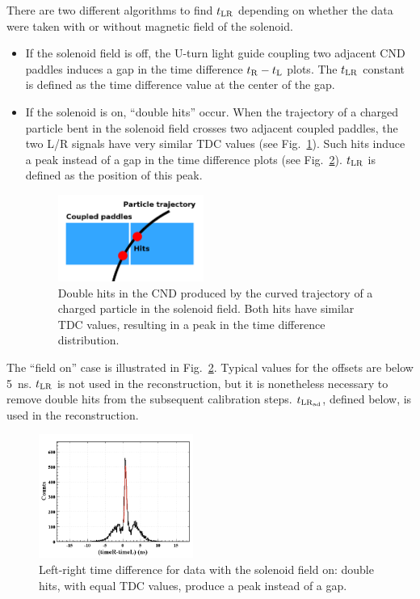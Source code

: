 There are two different algorithms to find $t_{\rm{LR}}$ depending on whether the data were taken with or without magnetic field of the solenoid. 
\begin{itemize}
\item If the solenoid field is off, the U-turn light guide coupling two adjacent CND paddles induces a gap in the time difference $t_{\rm{R}}-t_{\rm{L}}$ plots. The $t_{\rm{LR}}$ constant is defined as the time difference value at the center of the gap.
\item If the solenoid is on, ``double hits'' occur. When the trajectory of a charged particle bent in the solenoid field crosses two adjacent coupled paddles, the two L/R signals have very similar TDC values (see Fig.~\ref{doublehit}). Such hits induce a peak instead of a gap in the time difference plots (see Fig.~\ref{LR}). $t_{\rm{LR}}$ is defined as the position of this peak.

\begin{figure}[htb]
\begin{center}
\includegraphics[width=0.45\textwidth]{Figure/doublehit.png} 
\end{center}
\caption{Double hits in the CND produced by the curved trajectory of a charged particle in the solenoid field. Both hits have similar TDC values, resulting in a peak in the time difference distribution.}
\label{doublehit}
\end{figure}

\end{itemize}
The ``field on'' case is illustrated in Fig.~\ref{LR}. Typical values for the offsets are below 5~ns. $t_{\rm{LR}}$ is not used in the reconstruction, but it is nonetheless necessary to remove double hits from the subsequent calibration steps. $t_{\rm{LR}_{\rm{ad}}}$, defined below, is used in the reconstruction.
%
\begin{figure}[htb]
\begin{center}
\includegraphics[width=0.45\textwidth]{Figure/field.png} 
\end{center}
\caption{Left-right time difference for data with the solenoid field on: double hits, with equal TDC values, produce a peak instead of a gap.}
\label{LR}
\end{figure}
